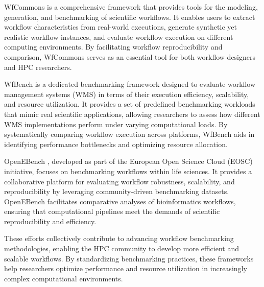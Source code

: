 \documentclass[sigconf]{acmart}
\begin{document}
WfCommons \citep{coleman2022-1} is a comprehensive framework that provides tools for the modeling, generation, and benchmarking of scientific workflows. It enables users to extract workflow characteristics from real-world executions, generate synthetic yet realistic workflow instances, and evaluate workflow execution on different computing environments. By facilitating workflow reproducibility and comparison, WfCommons serves as an essential tool for both workflow designers and HPC researchers.

WfBench \citep{coleman2022-2} is a dedicated benchmarking framework designed to evaluate workflow management systems (WMS) in terms of their execution efficiency, scalability, and resource utilization. It provides a set of predefined benchmarking workloads that mimic real scientific applications, allowing researchers to assess how different WMS implementations perform under varying computational loads. By systematically comparing workflow execution across platforms, WfBench aids in identifying performance bottlenecks and optimizing resource allocation.

OpenEBench \citep{Capella-Gutierrez2017}, developed as part of the European Open Science Cloud (EOSC) initiative, focuses on benchmarking workflows within life sciences. It provides a collaborative platform for evaluating workflow robustness, scalability, and reproducibility by leveraging community-driven benchmarking datasets. OpenEBench facilitates comparative analyses of bioinformatics workflows, ensuring that computational pipelines meet the demands of scientific reproducibility and efficiency.

These efforts collectively contribute to advancing workflow benchmarking methodologies, enabling the HPC community to develop more efficient and scalable workflows. By standardizing benchmarking practices, these frameworks help researchers optimize performance and resource utilization in increasingly complex computational environments.


\end{document}
